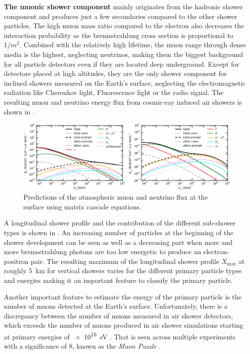 \textbf{The muonic shower component} mainly originates from the hadronic shower component and produces just a few secondaries compared to the other shower particles.
The high muon mass ratio compared to the electron also decreases the interaction probability as the bremsstrahlung cross section is proportional to $1/m^2$.
Combined with the relatively high lifetime, the muon range through dense media is the highest, neglecting neutrinos, making them the biggest background for all particle detectors even if they are located deep underground.
Except for detectors placed at high altitudes, they are the only shower component for inclined showers measured on the Earth's surface, neglecting the electromagnetic radiation like Cherenkov light, Fluorescence light or the radio signal.
The resulting muon and neutrino energy flux from cosmic-ray induced air showers is shown in .
\begin{figure}
    \centering
    \includegraphics[width=\textwidth]{./images/mceq_mu_nu_flux.pdf}
    \caption{Predictions of the atmospheric muon and neutrino flux at the surface using matrix cascade equations. \cite{Fedynitch15MCEq}}
    \label{fig:atmo_mu_nu_flux}
\end{figure}

A longitudinal shower profile and the contribution of the different sub-shower types is shown in .
An increasing number of particles at the beginning of the shower development can be seen as well as a decreasing part when more and more bremsstrahlung photons are too low energetic to produce an electron-positron pair.
The resulting maximum of the longitudinal shower profile $X_{\mathrm{max}}$ at roughly \SI{5}{km} for vertical showers varies for the different primary particle types and energies making it an important feature to classify the primary particle.

Another important feature to estimate the energy of the primary particle is the number of muons detected at the Earth's surface.
Unfortunately, there is a discrepancy between the number of muons measured in air shower detectors, which exceeds the number of muons produced in air shower simulations starting at primary energies of \SI{e16}{eV} \cite{Dembinski19MuonPuzzle}.
That is seen across multiple experiments with a significance of \SI{8}{\sigma}, known as the \textit{Muon Puzzle} \cite{Albrecht21MuonPuzzle}.

